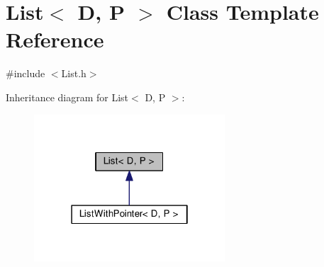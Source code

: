 \hypertarget{classList}{}\section{List$<$ D, P $>$ Class Template Reference}
\label{classList}


{\ttfamily \#include $<$List.\+h$>$}



Inheritance diagram for List$<$ D, P $>$\+:
\nopagebreak
\begin{figure}[H]
\begin{center}
\leavevmode
\includegraphics[width=202pt]{classList__inherit__graph}
\end{center}
\end{figure}
